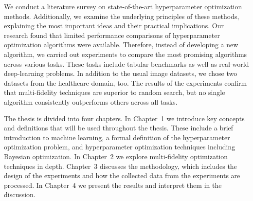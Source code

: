 We conduct a literature survey on state-of-the-art hyperparameter optimization methods. Additionally, we examine the underlying principles of these methods, explaining the most important ideas and their practical implications. Our research found that limited performance comparisons of hyperparameter optimization algorithms were available. Therefore, instead of developing a new algorithm, we carried out experiments to compare the most promising algorithms across various tasks. These tasks include tabular benchmarks as well as real-world deep-learning problems. In addition to the usual image datasets, we chose two datasets from the healthcare domain, too. The results of the experiments confirm that multi-fidelity techniques are superior to random search, but no single algorithm consistently outperforms others across all tasks.


The thesis is divided into four chapters. In Chapter~1 we introduce key concepts and definitions that will be used throughout the thesis. These include a brief introduction to machine learning, a formal definition of the hyperparameter optimization problem, and hyperparameter optimization techniques including Bayesian optimization. In Chapter~2 we explore multi-fidelity optimization techniques in depth. Chapter~3 discusses the methodology, which includes the design of the experiments and how the collected data from the experiments are processed. In Chapter~4 we present the results and interpret them in the discussion.



